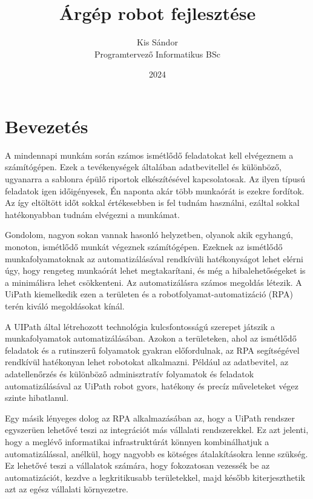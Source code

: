 \documentclass[
]{thesis-ekf}
\theoremstyle{definition}
\theoremstyle{remark}
\begin{document}
\title{Árgép robot fejlesztése}
\author{Kis Sándor\\Programtervező Informatikus BSc}
\date{2024}
\maketitle
\tableofcontents

\chapter*{Bevezetés}
A mindennapi munkám során számos ismétlődő feladatokat kell elvégeznem a számítógépen. Ezek a tevékenységek általában adatbevitellel és különböző, ugyanarra a sablonra épülő riportok elkészítésével kapcsolatosak. Az ilyen típusú feladatok igen időigényesek, Én naponta akár több munkaórát is ezekre fordítok. Az így eltöltött időt sokkal értékesebben is fel tudnám használni, ezáltal sokkal hatékonyabban tudnám elvégezni a munkámat.

Gondolom, nagyon sokan vannak hasonló helyzetben, olyanok akik egyhangú, monoton, ismétlődő munkát végeznek számítógépen. Ezeknek az ismétlődő munkafolyamatoknak az automatizálásával rendkívüli hatékonyságot lehet elérni úgy, hogy rengeteg munkaórát lehet megtakarítani, és még a hibalehetőségeket is a minimálisra lehet csökkenteni. Az automatizálásra számos megoldás létezik. A UiPath kiemelkedik ezen a területen és a robotfolyamat-automatizáció (RPA) terén kiváló megoldásokat kínál.

A UIPath által létrehozott technológia kulcsfontosságú szerepet játszik a munkafolyamatok automatizálásában. Azokon a területeken, ahol az ismétlődő feladatok és a rutinszerű folyamatok gyakran előfordulnak, az RPA segítségével rendkívül hatékonyan lehet robotokat alkalmazni. Például az adatbevitel, az adatellenőrzés és különböző adminisztratív folyamatok és feladatok automatizálásával az UiPath robot gyors, hatékony és precíz műveleteket végez szinte hibatlanul.

Egy másik lényeges dolog az RPA alkalmazásában az, hogy a UiPath rendszer egyszerüen lehetővé teszi az integrációt más vállalati rendszerekkel. Ez azt jelenti, hogy a meglévő informatikai infrastruktúrát könnyen kombinálhatjuk a automatizálással, anélkül, hogy nagyobb es kötséges átalakításokra lenne szükség. Ez lehetővé teszi a vállalatok számára, hogy fokozatosan vezessék be az automatizációt, kezdve a legkritikusabb területekkel, majd később kiterjeszthetik azt az egész vállalati környezetre.
\end{document}
